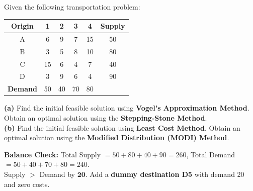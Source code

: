 \documentclass[12pt]{article}
\begin{document}
\begin{problembox}
Given the following transportation problem:

\vspace{8pt}
\begin{center}
\renewcommand{\arraystretch}{1.35}
\begin{tabular}{|c|c|c|c|c|c|}
  \hline
  \rowcolor{primary}
  {\color{white}\textbf{Origin}} &
  {\color{white}\textbf{1}} &
  {\color{white}\textbf{2}} &
  {\color{white}\textbf{3}} &
  {\color{white}\textbf{4}} &
  {\color{white}\textbf{Supply}} \\
  \hline
  \rowcolor{lightbg!50} A & 6 & 9 & 7 & 15 & 50 \\
  \hline
  B & 3 & 5 & 8 & 10 & 80 \\
  \hline
  \rowcolor{lightbg!50} C & 15 & 6 & 4 & 7 & 40 \\
  \hline
  D & 3 & 9 & 6 & 4 & 90 \\
  \hline
  \rowcolor{accent!20}
  \textbf{Demand} & 50 & 40 & 70 & 80 & \\
  \hline
\end{tabular}
\end{center}

\vspace{4pt}
\textbf{(a)} Find the initial feasible solution using \textbf{Vogel's Approximation Method}. Obtain an optimal solution using the \textbf{Stepping-Stone Method}.\\[4pt]
\textbf{(b)} Find the initial feasible solution using \textbf{Least Cost Method}. Obtain an optimal solution using the \textbf{Modified Distribution (MODI) Method}.
\end{problembox}

\vspace{10pt}

\begin{notebox}
\textbf{Balance Check:}\quad
Total Supply $= 50+80+40+90 = 260$,\quad
Total Demand $= 50+40+70+80 = 240$.\\[3pt]
Supply $>$ Demand by $\mathbf{20}$. Add a \textbf{dummy destination D5} with demand 20 and zero costs.
\end{notebox}

\vspace{6pt}
\end{document}
